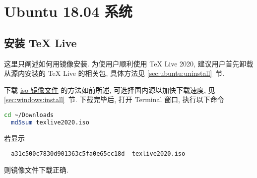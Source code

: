 
\chapter{Ubuntu 18.04 系统}

\section{安装 \TeX{} Live}

这里只阐述如何用镜像安装.
为使用户顺利使用 \TeX{} Live 2020,
建议用户首先卸载从源内安装的 \TeX{} Live 的相关包,
具体方法见 \ref{sec:ubuntu:uninstall}~节.

下载
\href{https://mirrors.ctan.org/systems/texlive/Images/texlive2020.iso}{iso 镜像文件}
的方法如前所述, 可选择国内源以加快下载速度, 见 \ref{sec:windows:install}~节.
下载完毕后, 打开 \textsf{Terminal} 窗口, 执行以下命令
\begin{lstlisting}[language = bash]
  cd ~/Downloads
  md5sum texlive2020.iso
\end{lstlisting}
若显示
\begin{lstlisting}
  a31c500c7830d901363c5fa0e65cc18d  texlive2020.iso
\end{lstlisting}
则镜像文件下载正确.

